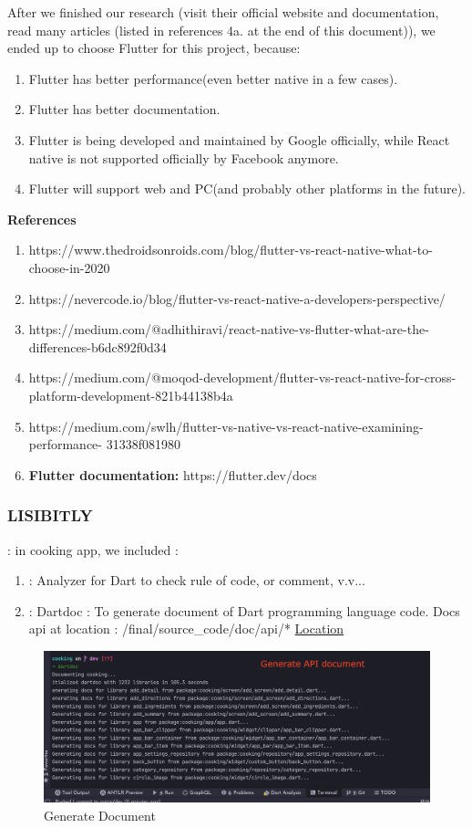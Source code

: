 \documentclass{article}
\begin{document}
After we finished our research (visit their official website and documentation, read many articles (listed in references 4a. at the end of this document)), we ended up to choose Flutter for this project, because:
\begin{enumerate}
        \item Flutter has better performance(even better native in a few cases).
        \item Flutter has better documentation.
        \item Flutter is being developed and maintained by Google officially, while React native is not supported officially by Facebook anymore.
        \item Flutter will support web and PC(and probably other platforms in the future). 
\end{enumerate}

\textbf{References}
\begin{enumerate}
\item https://www.thedroidsonroids.com/blog/flutter-vs-react-native-what-to-choose-in-2020 
\item https://nevercode.io/blog/flutter-vs-react-native-a-developers-perspective/
\item https://medium.com/@adhithiravi/react-native-vs-flutter-what-are-the-differences-b6dc892f0d34
\item https://medium.com/@moqod-development/flutter-vs-react-native-for-cross- platform-development-821b44138b4a
\item https://medium.com/swlh/flutter-vs-native-vs-react-native-examining-performance- 31338f081980
\item \textbf{Flutter documentation: }  https://flutter.dev/docs
\end{enumerate}

 \subsubsection{LISIBITLY} : in cooking app, we included : 
 \begin{enumerate}
 \item : Analyzer for Dart to check rule of code, or comment, v.v...
 \item : Dartdoc : To generate document of Dart programming language code. Docs api at location : /final/source_code/doc/api/* \href{/final/source_code/doc/api/}{Location }
 \end{enumerate}
 \begin{figure}[h!]
    \centering
    \includegraphics[scale=0.25]{Images/generatedoc.png}
    \caption{Generate Document}
    \label{fig:cookingbook}
\end{figure}
\end{document}
